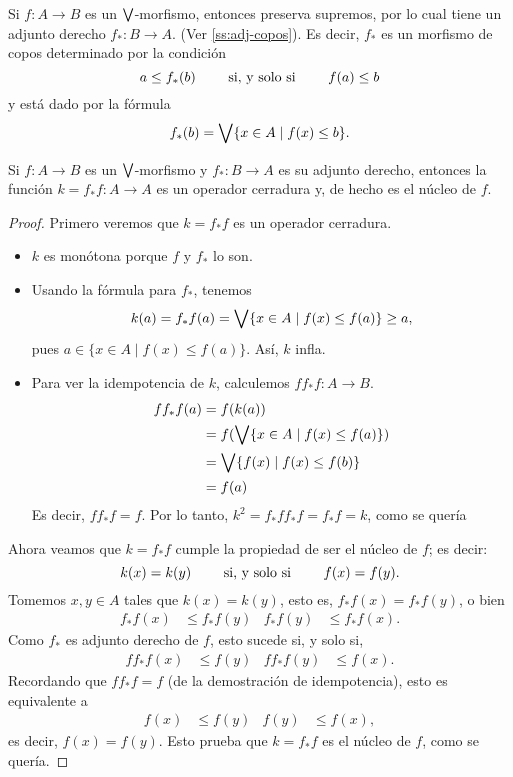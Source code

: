 Si $f:A\to B$ es un $\bigvee$-morfismo, entonces preserva supremos,
por lo cual tiene un adjunto derecho $f_*:B\to A$.
(Ver \ref{ss:adj-copos}).
Es decir, $f_*$ es un morfismo de copos determinado por la
condición
\[
    a\leq f_*(b) \qquad\text{ si, y solo si }\qquad f(a) \leq b
\]
y está dado por la fórmula
\[
    f_*(b) = \bigvee\{x\in A \mid f(x) \leq b\}
.\]
\begin{proposition}
  Si $f:A\to B$ es un $\bigvee$-morfismo y $f_*:B\to A$ es su adjunto
  derecho, entonces la función $k=f_*f:A\to A$ es un operador
  cerradura y, de hecho es el núcleo de $f$.
\end{proposition}
\begin{proof}
  Primero veremos que $k=f_*f$ es un operador cerradura.
  \begin{itemize}
    \item
    $k$ es monótona porque $f$ y $f_*$ lo son.
    \item 
    Usando la fórmula para $f_*$, tenemos
    \[
        k(a) = f_*f(a) = \bigvee\{x\in A \mid f(x) \leq f(a)\} \geq
        a
    ,\]
    pues $a\in\{x\in A\mid f(x)\leq f(a)\}$.
    Así, $k$ infla.
    \item
    Para ver la idempotencia de $k$, calculemos $ff_*f:A\to B$.
    \begin{align*}
        ff_*f(a)
        &= f(k(a)) \\
        &= f(\bigvee\{x\in A \mid f(x) \leq f(a) \}) \\
        &= \bigvee\{f(x) \mid f(x) \leq f(b) \} \\
        &= f(a)
    \end{align*}
    Es decir, $ff_*f=f$. Por lo tanto, $k^2 = f_*ff_*f=f_*f=k$,
    como se quería
\end{itemize}

Ahora veamos que $k=f_*f$ cumple la propiedad de ser el núcleo de
$f$; es decir:
\[
  k(x)=k(y) \qquad\text{ si, y solo si }\qquad f(x)=f(y)
.\]
Tomemos $x,y\in A$ tales que $k(x)=k(y)$,
esto es, $f_*f(x) = f_*f(y)$, o bien
\begin{align*}
  f_*f(x) &\leq f_*f(y)
  &
  f_*f(y) &\leq f_*f(x).
\end{align*}
Como $f_*$ es adjunto derecho de $f$, esto sucede si, y solo si,
\begin{align*}
  ff_*f(x) &\leq f(y)
  &
  ff_*f(y) &\leq f(x).
\end{align*}
Recordando que $ff_*f=f$ (de la demostración de idempotencia),
esto es equivalente a
\begin{align*}
  f(x) &\leq f(y)
  &
  f(y) &\leq f(x),
\end{align*}
es decir, $f(x)=f(y)$. Esto prueba que $k=f_*f$ es el núcleo de
$f$, como se quería.
\end{proof}

